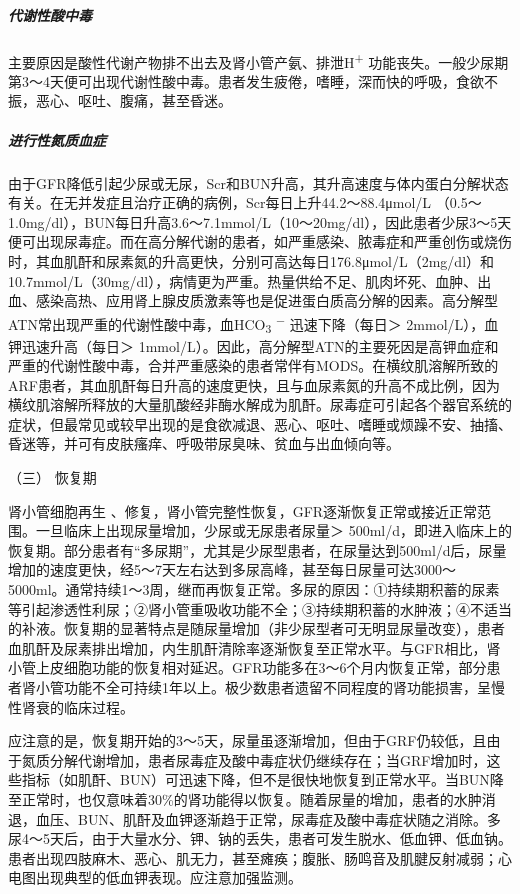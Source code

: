 \subparagraph{代谢性酸中毒}

主要原因是酸性代谢产物排不出去及肾小管产氨、排泄H\textsuperscript{+}
功能丧失。一般少尿期第3～4天便可出现代谢性酸中毒。患者发生疲倦，嗜睡，深而快的呼吸，食欲不振，恶心、呕吐、腹痛，甚至昏迷。

\subparagraph{进行性氮质血症}

由于GFR降低引起少尿或无尿，Scr和BUN升高，其升高速度与体内蛋白分解状态有关。在无并发症且治疗正确的病例，Scr每日上升44.2～88.4μmol/L
（0.5～1.0mg/dl），BUN每日升高3.6～7.1mmol/L（10～20mg/dl），因此患者少尿3～5天便可出现尿毒症。而在高分解代谢的患者，如严重感染、脓毒症和严重创伤或烧伤时，其血肌酐和尿素氮的升高更快，分别可高达每日176.8μmol/L（2mg/dl）和10.7mmol/L（30mg/dl），病情更为严重。热量供给不足、肌肉坏死、血肿、出血、感染高热、应用肾上腺皮质激素等也是促进蛋白质高分解的因素。高分解型ATN常出现严重的代谢性酸中毒，血HCO\textsubscript{3}
\textsuperscript{−} 迅速下降（每日＞ 2mmol/L），血钾迅速升高（每日＞
1mmol/L）。因此，高分解型ATN的主要死因是高钾血症和严重的代谢性酸中毒，合并严重感染的患者常伴有MODS。在横纹肌溶解所致的ARF患者，其血肌酐每日升高的速度更快，且与血尿素氮的升高不成比例，因为横纹肌溶解所释放的大量肌酸经非酶水解成为肌酐。尿毒症可引起各个器官系统的症状，但最常见或较早出现的是食欲减退、恶心、呕吐、嗜睡或烦躁不安、抽搐、昏迷等，并可有皮肤瘙痒、呼吸带尿臭味、贫血与出血倾向等。

\hypertarget{text00083.htmlux5cux23CHP3-7-5-2-3}{}
（三） 恢复期

肾小管细胞再生
、修复，肾小管完整性恢复，GFR逐渐恢复正常或接近正常范围。一旦临床上出现尿量增加，少尿或无尿患者尿量＞
500ml/d，即进入临床上的恢复期。部分患者有“多尿期”，尤其是少尿型患者，在尿量达到500ml/d后，尿量增加的速度更快，经5～7天左右达到多尿高峰，甚至每日尿量可达3000～5000ml。通常持续1～3周，继而再恢复正常。多尿的原因：①持续期积蓄的尿素等引起渗透性利尿；②肾小管重吸收功能不全；③持续期积蓄的水肿液；④不适当的补液。恢复期的显著特点是随尿量增加（非少尿型者可无明显尿量改变），患者血肌酐及尿素排出增加，内生肌酐清除率逐渐恢复至正常水平。与GFR相比，肾小管上皮细胞功能的恢复相对延迟。GFR功能多在3～6个月内恢复正常，部分患者肾小管功能不全可持续1年以上。极少数患者遗留不同程度的肾功能损害，呈慢性肾衰的临床过程。

应注意的是，恢复期开始的3～5天，尿量虽逐渐增加，但由于GRF仍较低，且由于氮质分解代谢增加，患者尿毒症及酸中毒症状仍继续存在；当GRF增加时，这些指标（如肌酐、BUN）可迅速下降，但不是很快地恢复到正常水平。当BUN降至正常时，也仅意味着30\%的肾功能得以恢复。随着尿量的增加，患者的水肿消退，血压、BUN、肌酐及血钾逐渐趋于正常，尿毒症及酸中毒症状随之消除。多尿4～5天后，由于大量水分、钾、钠的丢失，患者可发生脱水、低血钾、低血钠。患者出现四肢麻木、恶心、肌无力，甚至瘫痪；腹胀、肠鸣音及肌腱反射减弱；心电图出现典型的低血钾表现。应注意加强监测。

